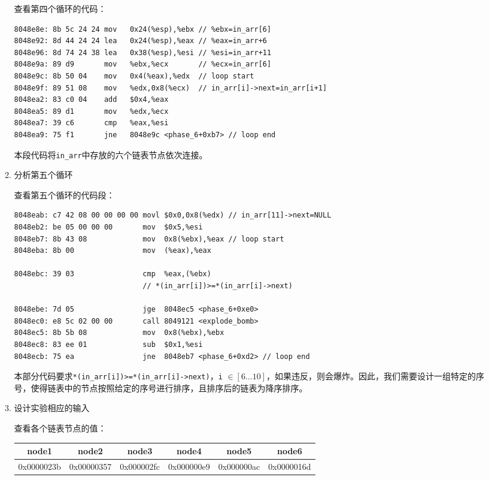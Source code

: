 \documentclass{paper}
\begin{document}
\begin{enumerate}
\begin{enumerate}
查看第四个循环的代码：
\begin{lstlisting}
8048e8e: 8b 5c 24 24 mov   0x24(%esp),%ebx // %ebx=in_arr[6]
8048e92: 8d 44 24 24 lea   0x24(%esp),%eax // %eax=in_arr+6
8048e96: 8d 74 24 38 lea   0x38(%esp),%esi // %esi=in_arr+11
8048e9a: 89 d9       mov   %ebx,%ecx       // %ecx=in_arr[6]
8048e9c: 8b 50 04    mov   0x4(%eax),%edx  // loop start
8048e9f: 89 51 08    mov   %edx,0x8(%ecx)  // in_arr[i]->next=in_arr[i+1]
8048ea2: 83 c0 04    add   $0x4,%eax
8048ea5: 89 d1       mov   %edx,%ecx
8048ea7: 39 c6       cmp   %eax,%esi
8048ea9: 75 f1       jne   8048e9c <phase_6+0xb7> // loop end
\end{lstlisting}
本段代码将\verb|in_arr|中存放的六个链表节点依次连接。

\item 分析第五个循环

查看第五个循环的代码段：
\begin{lstlisting}
8048eab: c7 42 08 00 00 00 00 movl $0x0,0x8(%edx) // in_arr[11]->next=NULL
8048eb2: be 05 00 00 00       mov  $0x5,%esi
8048eb7: 8b 43 08             mov  0x8(%ebx),%eax // loop start
8048eba: 8b 00                mov  (%eax),%eax

8048ebc: 39 03                cmp  %eax,(%ebx)
                              // *(in_arr[i])>=*(in_arr[i]->next)

8048ebe: 7d 05                jge  8048ec5 <phase_6+0xe0>
8048ec0: e8 5c 02 00 00       call 8049121 <explode_bomb>
8048ec5: 8b 5b 08             mov  0x8(%ebx),%ebx
8048ec8: 83 ee 01             sub  $0x1,%esi
8048ecb: 75 ea                jne  8048eb7 <phase_6+0xd2> // loop end
\end{lstlisting}
本部分代码要求\verb|*(in_arr[i])>=*(in_arr[i]->next)|，\verb|i| $\in [6...10]$，如果违反，则会爆炸。因此，我们需要设计一组特定的序号，使得链表中的节点按照给定的序号进行排序，且排序后的链表为降序排序。

\item 设计实验相应的输入

查看各个链表节点的值：
\begin{center}
\begin{tabular}{|c|c|c|c|c|c|}
\hline
node1 & node2 & node3 & node4 & node5 & node6 \\
\hline
0x0000023b & 0x00000357 & 0x000002fc & 0x000000e9 & 0x000000ac & 0x0000016d \\
\hline
\end{tabular}
\end{center}


\end{enumerate}
\end{enumerate}
\end{document}
